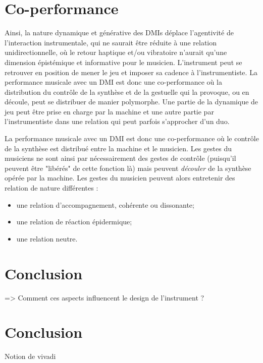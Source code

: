 \clearpage

\section{Co-performance}
Ainsi, la nature dynamique et générative des DMIs déplace l'agentivité de l'interaction instrumentale, qui ne saurait être réduite à une relation unidirectionnelle, où le retour haptique et/ou vibratoire n'aurait qu'une dimension épistémique et informative pour le musicien.
L'instrument peut se retrouver en position de mener le jeu et imposer sa cadence à l'instrumentiste. La performance musicale avec un DMI est donc une co-performance où la distribution du contrôle de la synthèse et de la gestuelle qui la provoque, ou en découle, peut se distribuer de manier polymorphe. Une partie de la dynamique de jeu peut être prise en charge par la machine et une autre partie par l'instrumentiste dans une relation qui peut parfois s'approcher d'un duo.

 La performance musicale avec un DMI est donc une co-performance où le contrôle de la synthèse est distribué entre la machine et le musicien. 
 Les gestes du musiciens ne sont ainsi par nécessairement des gestes de contrôle (puisqu'il peuvent être "libérés" de cette fonction là) mais peuvent \textit{découler} de la synthèse opérée par la machine. Les gestes du musicien peuvent alors entretenir des relation de nature différentes :

\vspace{-1em}
\begin{itemize}[noitemsep]
\item une relation d'accompagnement, cohérente ou dissonante;
\item une relation de réaction épidermique;
\item une relation neutre.
\end{itemize}
 
 
\section{Conclusion}
\label{sec:transparency:conclusion}
=> Comment ces aspects influencent le design de l’instrument ?

\section*{Conclusion}
Notion de vivadi


